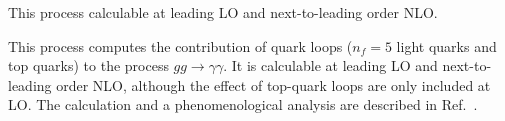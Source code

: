This process calculable at leading LO and next-to-leading order NLO.

This process computes the contribution of quark loops ($n_f = 5$ light
quarks and top quarks) to the process $gg \to \gamma\gamma$.  It is
calculable at leading LO and next-to-leading order NLO, although the
effect of top-quark loops are only included at LO.  The calculation
and a phenomenological analysis are described in
Ref.~\cite{Campbell:2016yrh}.
